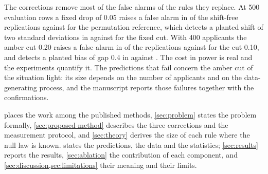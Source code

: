The corrections remove most of the false alarms of the rules they replace. At 500 evaluation rows a fixed drop of 0.05 raises a false alarm in \ShRateFixedFiveCZ{} of the shift-free replications against \ShRatePermCZ{} for the permutation reference, which detects a planted shift of two standard deviations in \ShRatePermCT{} against \ShRateFixedFiveCT{} for the fixed cut. With 400 applicants the amber cut 0.20 raises a false alarm in \SiRateCutTwentySmallZ{} of the replications against \SiRateCutTenSmallZ{} for the cut 0.10, and detects a planted bias of gap 0.4 in \SiRateCutTwentySmallC{} against \SiRateCutTenSmallC{}. The cost in power is real and the experiments quantify it. The predictions that fail concern the amber cut of the situation light: its size depends on the number of applicants and on the data-generating process, and the manuscript reports those failures together with the confirmations.

 places the work among the published methods, \cref{sec:problem} states the problem formally, \cref{sec:proposed-method} describes the three corrections and the measurement protocol, and \cref{sec:theory} derives the size of each rule where the null law is known.  states the predictions, the data and the statistics; \cref{sec:results} reports the results, \cref{sec:ablation} the contribution of each component, and \cref{sec:discussion,sec:limitations} their meaning and their limits.
